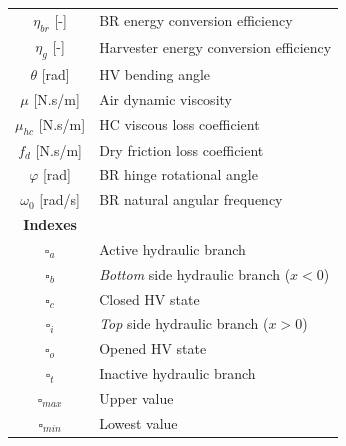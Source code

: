\documentclass[3p,twocolumn,preprint]{elsarticle}
\begin{document}
\begin{table}
\begin{minipage}{.5\textwidth}
\begin{tabular}{ c  m{6cm} }
		$\eta_{br}$ [-]          & BR energy conversion efficiency                         \\
		$\eta_g$ [-]             & Harvester energy conversion efficiency                  \\
		$\theta$ [rad]           & HV bending angle                                        \\
		$\mu$ [N.s/m]             & Air dynamic viscosity                                   \\
		$\mu_{hc}$ [N.s/m]        & HC viscous loss coefficient                             \\
		$f_d$ [N.s/m]             & Dry friction loss coefficient                           \\
		$\varphi$ [rad]			 & BR hinge rotational angle							   \\
		$\omega_0$ [rad/s]       & BR natural angular frequency                            \\
		\textbf{Indexes}         &                                                         \\
		$\square_a$              & Active hydraulic branch                                 \\
		$\square_b$              & \emph{Bottom} side hydraulic branch ($x <0$)            \\
		$\square_c$              & Closed HV state              						   \\
		$\square_i$              & \emph{Top} side hydraulic branch ($x >0$)               \\
		$\square_o$              & Opened HV state             							   \\
		$\square_t$              & Inactive hydraulic branch                               \\
		$\square_{max}$          & Upper value                                             \\
		$\square_{min}$          & Lowest value                                            \\
	\end{tabular}
\end{minipage}
		\begin{center}
			\noindent\makebox[\linewidth]{\rule{\textwidth}{0.4pt}}
		\end{center}
\end{table}
\end{document}
